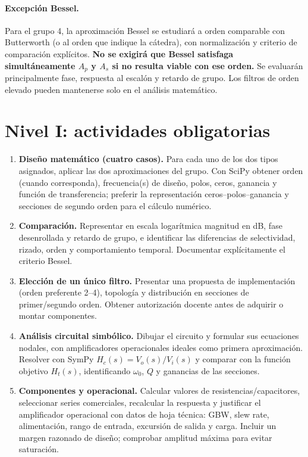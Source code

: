 \documentclass[11pt,a4paper]{article}
\begin{document}
\paragraph{Excepción Bessel.} Para el grupo 4, la aproximación Bessel se estudiará a orden comparable con Butterworth (o al orden que indique la cátedra), con normalización y criterio de comparación explícitos. \textbf{No se exigirá que Bessel satisfaga simultáneamente $A_p$ y $A_s$ si no resulta viable con ese orden.} Se evaluarán principalmente fase, respuesta al escalón y retardo de grupo. Los filtros de orden elevado pueden mantenerse solo en el análisis matemático.
\section{Nivel I: actividades obligatorias}
\begin{enumerate}
\item \textbf{Diseño matemático (cuatro casos).} Para cada uno de los dos tipos asignados, aplicar las dos aproximaciones del grupo. Con SciPy obtener orden (cuando corresponda), frecuencia(s) de diseño, polos, ceros, ganancia y función de transferencia; preferir la representación ceros--polos--ganancia y secciones de segundo orden para el cálculo numérico.
\item \textbf{Comparación.} Representar en escala logarítmica magnitud en dB, fase desenrollada y retardo de grupo, e identificar las diferencias de selectividad, rizado, orden y comportamiento temporal. Documentar explícitamente el criterio Bessel.
\item \textbf{Elección de un único filtro.} Presentar una propuesta de implementación (orden preferente 2--4), topología y distribución en secciones de primer/segundo orden. Obtener autorización docente antes de adquirir o montar componentes.
\item \textbf{Análisis circuital simbólico.} Dibujar el circuito y formular sus ecuaciones nodales, con amplificadores operacionales ideales como primera aproximación. Resolver con SymPy $H_c(s)=V_o(s)/V_i(s)$ y comparar con la función objetivo $H_t(s)$, identificando $\omega_0$, $Q$ y ganancias de las secciones.
\item \textbf{Componentes y operacional.} Calcular valores de resistencias/capacitores, seleccionar series comerciales, recalcular la respuesta y justificar el amplificador operacional con datos de hoja técnica: GBW, slew rate, alimentación, rango de entrada, excursión de salida y carga. Incluir un margen razonado de diseño; comprobar amplitud máxima para evitar saturación.

\end{enumerate}
\end{document}
